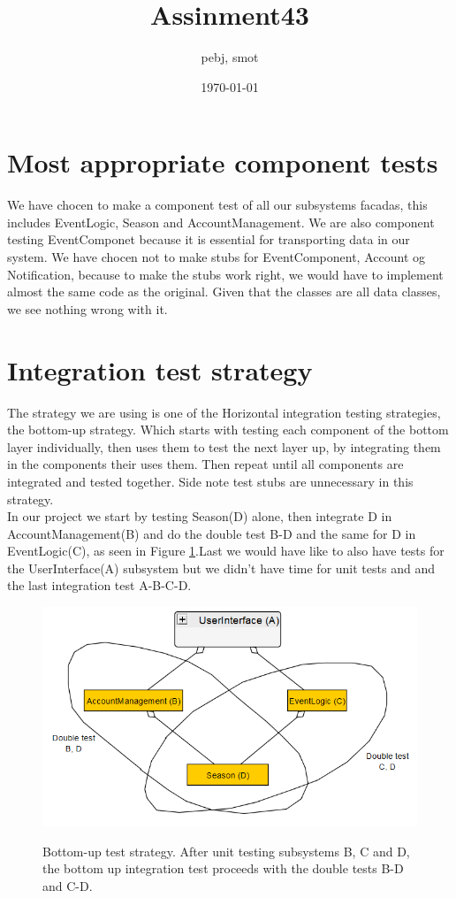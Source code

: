 \documentclass[a4paper]{article}
\title{Assinment43}
\author{pebj, smot}
\date{\today}
\begin{document}
\maketitle

\section{Most appropriate component tests}
	We have chocen to make a component test of all our  subsystems facadas, this includes EventLogic, Season and AccountManagement. We are also component testing EventComponet because it is essential for transporting data in our system. We have chocen not to make stubs for EventComponent, Account og Notification, because to make the stubs work right, we would have to implement almost the same code as the original. Given that the classes are all data classes, we see nothing wrong with it.
    
\section{Integration test strategy}
   	The strategy we are using is one of the Horizontal integration testing strategies, the bottom-up strategy. Which starts with testing each component of the bottom layer individually, then uses them to test the next layer up, by integrating them in the components their uses them. Then repeat until all components are integrated and tested together. Side note test stubs are unnecessary in this strategy.\\
	In our project we start by testing Season(D) alone, then integrate D in AccountManagement(B) and do the double test B-D and the same for D in EventLogic(C), as seen in Figure \ref{fig:Model}.Last we would have like to also have tests for the UserInterface(A) subsystem but we didn't have time for unit tests and and the last integration test A-B-C-D.


	\begin{figure}
		\centering
		\includegraphics[width=1\textwidth]{UMLtestDiagram.PNG}\\
		\caption{Bottom-up test strategy. After unit testing subsystems B, C and D, the bottom up integration 
			test proceeds with the double tests B-D and C-D.}
		\label{fig:Model}
	\end{figure}
\end{document}
